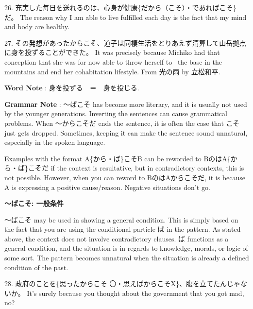 \par{26. 充実した毎日を送れるのは、心身が健康\{だから（こそ）・であればこそ\}だ。 \hfill\break
The reason why I am able to live fulfilled each day is the fact that my mind and body are healthy. }

\par{27. その発想があったからこそ、道子は同棲生活をとりあえず清算して山岳拠点に身を投ずることができた。 \hfill\break
It was precisely because Michiko had that conception that she was for now able to throw herself to  the base in the mountains and end her cohabitation lifestyle. \hfill\break
From 光の雨 by 立松和平. }

\par{\textbf{Word Note }: 身を投ずる　＝　身を投じる. }

\par{\textbf{Grammar Note }: ～ばこそ has become more literary, and it is usually not used by the younger generations. Inverting the sentences can cause grammatical problems. When ～からこそだ ends the sentence, it is often the case that こそ just gets dropped. Sometimes, keeping it can make the sentence sound unnatural, especially in the spoken language. }

\par{ Examples with the format A\{から・ば\}こそB can be reworded to BのはA\{から・ば\}こそだ if the context is resultative, but in contradictory contexts, this is not possible. However, when you can reword to BのはAからこそだ, it is because A is expressing a positive cause\slash reason. Negative situations don't go. }

\begin{center}
 \textbf{～ばこそ: 一般条件 }
\end{center}

\par{ ～ばこそ may be used in showing a general condition. This is simply based on the fact that you are using the conditional particle ば in the pattern. As stated above, the context does not involve contradictory clauses. ば functions as a general condition, and the situation is in regards to knowledge, morals, or logic of some sort. The pattern becomes unnatural when the situation is already a defined condition of the past. }

\par{28. 政府のことを\{思ったからこそ 〇・思えばからこそX\}、腹を立てたんじゃないか。 \hfill\break
It's surely because you thought about the government that you got mad, no? }

